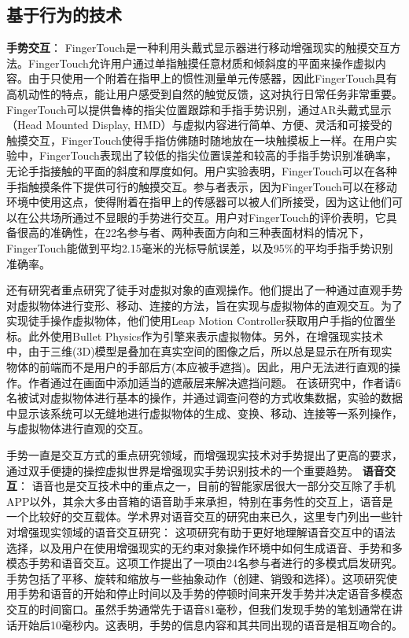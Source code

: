 \subsection{基于行为的技术}
\textbf{手势交互}：
FingerTouch\cite{OhParPar20}是一种利用头戴式显示器进行移动增强现实的触摸交互方法。FingerTouch允许用户通过单指触摸任意材质和倾斜度的平面来操作虚拟内容。由于只使用一个附着在指甲上的惯性测量单元传感器，因此FingerTouch具有高机动性的特点，能让用户感受到自然的触觉反馈，这对执行日常任务非常重要。
FingerTouch可以提供鲁棒的指尖位置跟踪和手指手势识别，通过AR头戴式显示（Head Mounted Display, HMD）与虚拟内容进行简单、方便、灵活和可接受的触摸交互，FingerTouch使得手指仿佛随时随地放在一块触摸板上一样。在用户实验中，FingerTouch表现出了较低的指尖位置误差和较高的手指手势识别准确率，无论手指接触的平面的斜度和厚度如何。用户实验表明，FingerTouch可以在各种手指触摸条件下提供可行的触摸交互。参与者表示，因为FingerTouch可以在移动环境中使用这点，使得附着在指甲上的传感器可以被人们所接受，因为这让他们可以在公共场所通过不显眼的手势进行交互。用户对FingerTouch的评价表明，它具备很高的准确性，在22名参与者、两种表面方向和三种表面材料的情况下，FingerTouch能做到平均2.15毫米的光标导航误差，以及95\%的平均手指手势识别准确率。

还有研究者\cite{SakIshHor20}重点研究了徒手对虚拟对象的直观操作。他们提出了一种通过直观手势对虚拟物体进行变形、移动、连接的方法，旨在实现与虚拟物体的直观交互。为了实现徒手操作虚拟物体，他们使用Leap Motion Controller\cite{ultraleap}获取用户手指的位置坐标。此外使用Bullet Physics\cite{BulletPhysics}作为引擎来表示虚拟物体。另外，在增强现实技术中，由于三维(3D)模型是叠加在真实空间的图像之后，所以总是显示在所有现实物体的前端而不是用户的手部后方(本应被手遮挡)。因此，用户无法进行直观的操作。作者通过在画面中添加适当的遮蔽层来解决遮挡问题。
在该研究中，作者请6名被试对虚拟物体进行基本的操作，并通过调查问卷的方式收集数据，实验的数据中显示该系统可以无缝地进行虚拟物体的生成、变换、移动、连接等一系列操作，与虚拟物体进行直观的交互。

手势一直是交互方式的重点研究领域，而增强现实技术对手势提出了更高的要求，通过双手便捷的操控虚拟世界是增强现实手势识别技术的一个重要趋势。
\textbf{语音交互}：
语音也是交互技术中的重点之一，目前的智能家居很大一部分交互除了手机APP以外，其余大多由音箱的语音助手来承担，特别在事务性的交互上，语音是一个比较好的交互载体。学术界对语音交互的研究由来已久，这里专门列出一些针对增强现实领域的语音交互研究：
这项研究\cite{WilOrt20}有助于更好地理解语音交互中的语法选择，以及用户在使用增强现实的无约束对象操作环境中如何生成语音、手势和多模态手势和语音交互。这项工作提出了一项由24名参与者进行的多模式启发研究。手势包括了平移、旋转和缩放与一些抽象动作（创建、销毁和选择）。这项研究使用手势和语音的开始和停止时间以及手势的停顿时间来开发手势并决定语音多模态交互的时间窗口。虽然手势通常先于语音81毫秒，但我们发现手势的笔划通常在讲话开始后10毫秒内。这表明，手势的信息内容和其共同出现的语音是相互吻合的。


